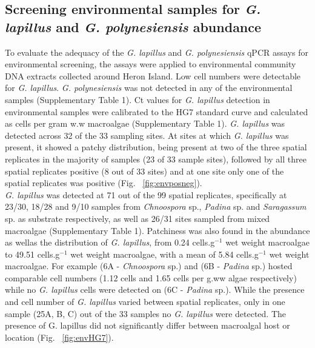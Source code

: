\documentclass[12pt]{article}
\begin{document}
\subsection*{Screening environmental samples for \emph{G. lapillus} and \emph{G. polynesiensis} abundance}
To evaluate the adequacy of the \emph{G. lapillus} and \emph{G. polynesiensis} qPCR assays for environmental screening, the assays were applied to environmental community DNA extracts collected around Heron Island. Low cell numbers were detectable for \emph{G. lapillus}. \emph{G. polynesiensis} was not detected in any of the environmental samples (Supplementary Table 1).
Ct values for \emph{G. lapillus} detection in environmental samples were calibrated to the HG7 standard curve and calculated as cells per gram w.w macroalgae (Supplementary Table 1). 
\emph{G. lapillus} was detected across 32 of the 33 sampling sites. At sites at which \textit{G. lapillus} was present, it showed a patchy distribution, being present at two of the three spatial replicates in the majority of samples (23 of 33 sample sites), followed by all three spatial replicates positive (8 out of 33 sites) and at one site only one of the spatial replicates was positive (Fig. ~\ref{fig:envposneg}). \\
\emph{G. lapillus} was detected at 71 out of the 99 spatial replicates, specifically at 23/30, 18/28 and 9/10 samples from \emph{Chnoospora} sp., \emph{Padina} sp. and \emph{Saragassum} sp. as substrate respectively, as well as 26/31 sites sampled from mixed macroalgae (Supplementary Table 1).
Patchiness was also found in the abundance as wellas the distribution of 
\emph{G. lapillus}, from 0.24 cells.g$^{-1}$ wet weight macroalgae to 49.51 cells.g$^{-1}$ wet weight macroalgae, with a mean of 5.84 cells.g$^{-1}$ wet weight macroalgae. For example (6A - \emph{Chnoospora} sp.) and (6B - \emph{Padina} sp.) hosted comparable cell numbers (1.12 cells and 1.65 cells per g.ww algae respectively) while no \emph{G. lapillus} cells were detected on (6C - \emph{Padina} sp.). While the presence and cell number of \emph{G. lapillus} varied between spatial replicates, only in one sample (25A, B, C) out of the 33 samples no \emph{G. lapillus} were detected. The presence of G. lapillus did not significantly differ between macroalgal host or location (Fig. ~\ref{fig:envHG7}). 

\newpage
\end{document}
